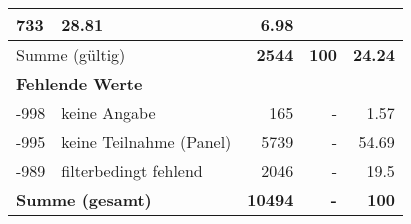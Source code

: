 \begin{longtable}{lXrrr}
       \num{733} &
       \num[round-mode=places,round-precision=2]{28.81} &
         \num[round-mode=places,round-precision=2]{6.98} \\
     \midrule
     \multicolumn{2}{l}{Summe (gültig)} &
       \textbf{\num{2544}} &
     \textbf{\num{100}} &
       \textbf{\num[round-mode=places,round-precision=2]{24.24}} \\
     \multicolumn{5}{l}{\textbf{Fehlende Werte}}\\
       -998 &
       keine Angabe &
         \num{165} &
        - &
         \num[round-mode=places,round-precision=2]{1.57} \\
       -995 &
       keine Teilnahme (Panel) &
         \num{5739} &
        - &
         \num[round-mode=places,round-precision=2]{54.69} \\
       -989 &
       filterbedingt fehlend &
         \num{2046} &
        - &
         \num[round-mode=places,round-precision=2]{19.5} \\
     \midrule
     \multicolumn{2}{l}{\textbf{Summe (gesamt)}} &
          \textbf{\num{10494}} &
        \textbf{-} &
        \textbf{\num{100}} \\
     \bottomrule
     \end{longtable}
     
